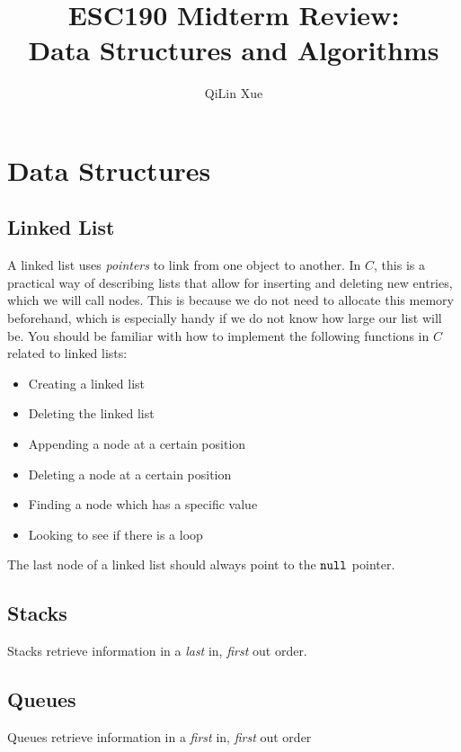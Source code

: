 \documentclass{article}
\title{\textbf{ESC190 Midterm Review:} \\ Data Structures and Algorithms}
\author{QiLin Xue}
\begin{document}
    \maketitle
    \tableofcontents
    \section{Data Structures}
    \subsection{Linked List}
    A linked list uses \textit{pointers} to link from one object to another. In $C$, this is a practical way of describing lists that allow for inserting and deleting new entries, which we will call nodes. This is because we do not need to allocate this memory beforehand, which is especially handy if we do not know how large our list will be. You should be familiar with how to implement the following functions in $C$ related to linked lists:
    \begin{itemize}
        \item Creating a linked list
        \item Deleting the linked list
        \item Appending a node at a certain position
        \item Deleting a node at a certain position
        \item Finding a node which has a specific value
        \item Looking to see if there is a loop
    \end{itemize}
    The last node of a linked list should always point to the $\verb#null#$ pointer.
    \label{linked list}
    \subsection{Stacks}
    Stacks retrieve information in a \textit{last} in, \textit{first} out order.

    \subsection{Queues}
    Queues retrieve information in a \textit{first} in, \textit{first} out order
\end{document}
